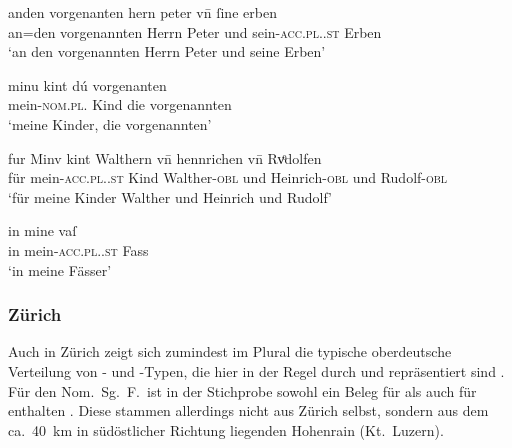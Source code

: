 \begin{exe}
\ex \label{ex:adjbaselregel}
	\begin{xlist}
	\ex \label{ex:adjbaselregel_1}
		\gll anden vorgenanten hern peter vn̄ ſine erben \\
			an=den vorgenannten Herrn Peter und sein-\textsc{acc.pl.\MascM.st}
				Erben \\
		\trans `an den vorgenannten Herrn Peter und seine Erben'
			\parencites(Nr.~1682, Basel, 1293)[16,15--16]{cao3}

	\ex \label{ex:adjbaselregel_2}
		\gll minu kint dú vorgenanten \\
			mein-\textsc{nom.pl.\NeutMF} Kind die vorgenannten \\
		\trans `meine Kinder, die vorgenannten'
			\parencites(Nr.~3184, Rheinfelden, Kt.~Aargau, 1299)[376,13]{cao4}
	\end{xlist}

\ex \label{ex:adjbaselu}
	\begin{xlist}
	\ex \label{ex:adjbaselu_1}
		\gll fur Minv kint Walthern vn̄ hennrichen vn̄ Rvͦdolfen \\
			für mein-\textsc{acc.pl.\NeutM.st} Kind Walther-\textsc{obl} und
			Heinrich-\textsc{obl} und Rudolf-\textsc{obl} \\
		\trans `für meine Kinder Walther und Heinrich und Rudolf'
			\parencites(Nr.~1108, Basel, 1289)[402,36--37]{cao2}

	\ex \label{ex:adjbaselu_2}
		\gll in mine vaſ \\
			in mein-\textsc{acc.pl.\NeutI.st} Fass \\
		\trans `in meine Fässer'
			\parencites(Nr.~N~483, Mulhouse, Dépt.~Haut-Rhin, 1291)[351,23]{cao5}
	\end{xlist}
\end{exe}

\subsubsection{Zürich}
\label{par:adjzuerich}
Auch in Zürich zeigt sich zumindest im Plural die typische
oberdeutsche Verteilung von
- und -Typen, die hier in der Regel durch  und 
repräsentiert sind . Für den Nom.\ Sg.\ F.\ ist in der
Stichprobe sowohl ein Beleg für  als auch für  enthalten
. Diese stammen allerdings nicht aus Zürich selbst, sondern aus
dem ca.\ 40~km in südöstlicher Richtung liegenden Hohenrain (Kt.~Luzern).

